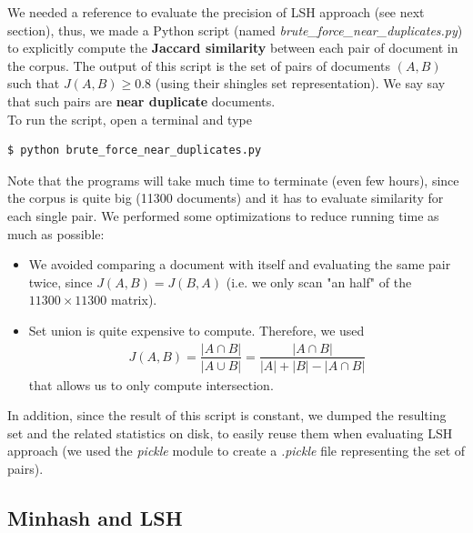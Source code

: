 We needed a reference to evaluate the precision of LSH approach (see next section), thus, we made a Python script (named \textit{brute\_force\_near\_duplicates.py}) to explicitly compute the \textbf{Jaccard similarity}\cite{jacc} between each pair of document in the corpus. The output of this script is the set of pairs of documents $(A,B)$ such that $J(A,B) \ge 0.8$ (using their shingles set representation). We say say that such pairs are \textbf{near duplicate} documents.\\
To run the script, open a terminal and type
\begin{lstlisting}
$ python brute_force_near_duplicates.py
\end{lstlisting}
\medskip

\noindent Note that the programs will take much time to terminate (even few hours), since the corpus is quite big (11300 documents) and it has to evaluate similarity for each single pair. We performed some optimizations to reduce running time as much as possible:
\begin{itemize}
\item We avoided comparing a document with itself and evaluating the same pair twice, since $J(A,B) = J(B,A)$ (i.e. we only scan "an half" of the $11300 \times 11300$ matrix).

\item Set union is quite expensive to compute. Therefore, we used
\begin{align*}
J(A,B) = \dfrac{|A \cap B|}{|A \cup B|} = \dfrac{|A \cap B|}{|A|+|B|-|A \cap B|}
\end{align*}
that allows us to only compute intersection.
\end{itemize}

\noindent In addition, since the result of this script is constant, we dumped the resulting set and the related statistics on disk, to easily reuse them when evaluating LSH approach (we used the \textit{pickle}\cite{pickle} module to create a \textit{.pickle} file representing the set of pairs).

\subsection{Minhash and LSH}

